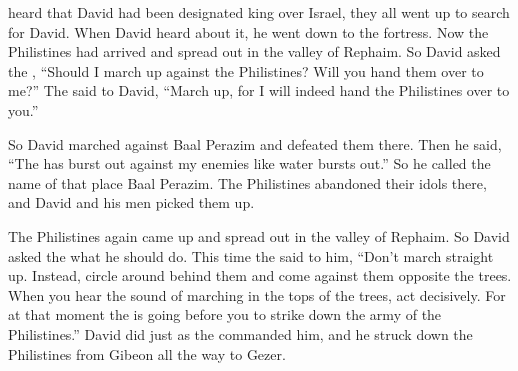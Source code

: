 {heard
that
David
had been designated
king
over
Israel,
they all
went up
to search
for David.
When David
heard
about it, he went down
to
the fortress.
Now the Philistines
had arrived
and spread
out in the valley
of Rephaim.
So David
asked
the {}, “Should I march up
against the Philistines? Will you
hand
them over to me?” The
{}
said
to
David,
“March up,
for I
will
indeed
hand
the Philistines
over to you.”
\par }{\PP {}So David
marched
against Baal Perazim
and defeated
them there.
Then he
said,
“The
{}
has burst out
against my enemies
like water
bursts out.”
So
he called
the name
of that place
Baal Perazim.
The Philistines abandoned
their idols
there,
and David
and his men
picked them up.
\par }{\PP {}The Philistines
again
came up
and spread
out in the valley
of Rephaim.
So David
asked
the {}
what he should do. This time the
{} said
to him, “Don’t
march straight up.
Instead, circle
around behind
them and come
against them opposite
the trees.
When
you hear
the sound
of marching
in the tops
of the trees,
act decisively.
For
at that moment the
{}
is going before
you to strike
down the army
of the Philistines.”
David
did
just
as the
{}
commanded
him, and he struck
down the Philistines
from Gibeon
all
the way to Gezer.

}
